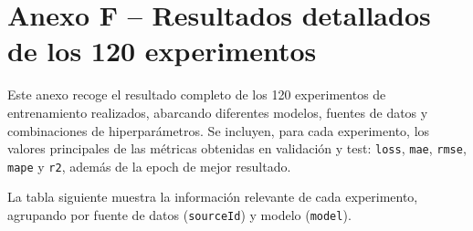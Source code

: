 \section*{Anexo F – Resultados detallados de los 120 experimentos}
\label{anexo:resultados_exp}

Este anexo recoge el resultado completo de los 120 experimentos de entrenamiento realizados, abarcando diferentes modelos, fuentes de datos y combinaciones de hiperparámetros. Se incluyen, para cada experimento, los valores principales de las métricas obtenidas en validación y test: \texttt{loss}, \texttt{mae}, \texttt{rmse}, \texttt{mape} y \texttt{r2}, además de la epoch de mejor resultado. 

La tabla siguiente muestra la información relevante de cada experimento, agrupando por fuente de datos (\texttt{sourceId}) y modelo (\texttt{model}).

